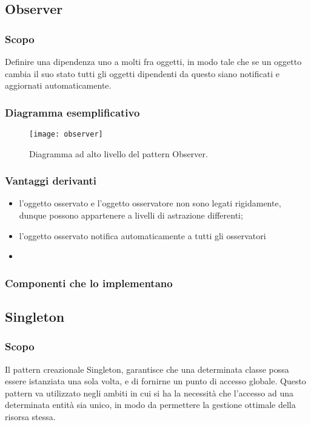 \subsection{Observer}
\subsubsection{Scopo}
Definire una dipendenza uno a molti fra oggetti, in modo tale che se un oggetto cambia il suo stato tutti gli oggetti dipendenti da questo siano notificati e aggiornati automaticamente.
\subsubsection{Diagramma esemplificativo}
\begin{figure}[h]
\centering
\texttt{[image: observer]}
\caption{Diagramma ad alto livello del pattern Observer.}\label{fig:observer}
\end{figure}
\subsubsection{Vantaggi derivanti}
\begin{itemize}
\item l'oggetto osservato e l'oggetto osservatore non sono legati rigidamente, dunque possono appartenere a livelli di astrazione differenti;
\item l'oggetto osservato notifica automaticamente a tutti gli osservatori
\item 
\end{itemize}
\subsubsection{Componenti che lo implementano}

\subsection{Singleton}
\subsubsection{Scopo}
Il pattern creazionale Singleton, garantisce che una determinata classe possa essere istanziata una sola volta, e di fornirne un punto di accesso globale. Questo pattern va utilizzato negli ambiti in cui si ha la necessità che l'accesso ad una determinata entità sia unico, in modo da permettere la gestione ottimale della risorsa stessa.
